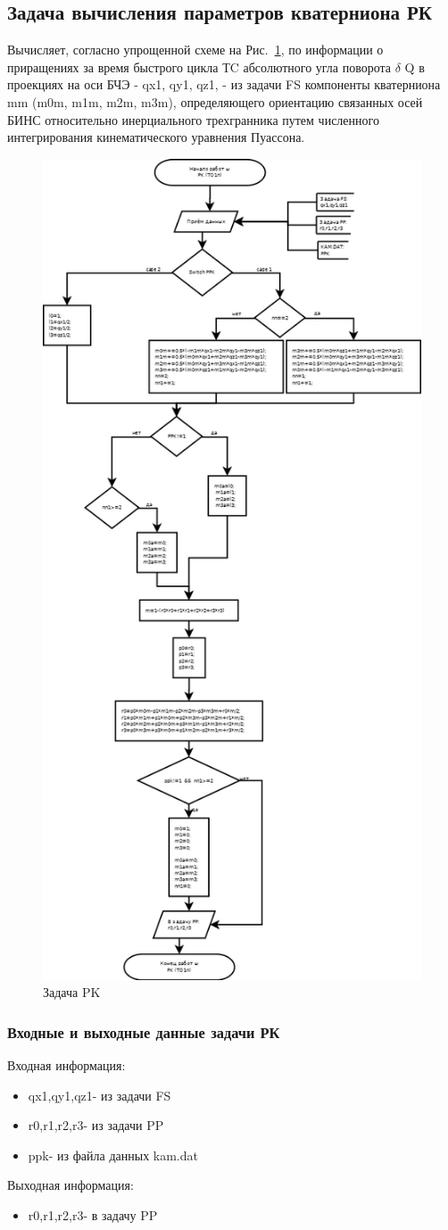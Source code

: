 \subsection{Задача вычисления параметров кватерниона РК}
Вычисляет, согласно упрощенной схеме на Рис.~\ref{fig:PK},  по  информации о приращениях за время быстрого цикла ТC  абсолютного угла поворота $\delta$ Q в проекциях на оси БЧЭ -  qx1, qy1, qz1, - из задачи  FS 
компоненты кватерниона mm (m0m, m1m, m2m, m3m), определяющего  ориентацию связанных осей БИНС относительно инерциального трехгранника путем численного 
интегрирования кинематического уравнения Пуассона.
\begin{figure}[H]
    \centering
    \includegraphics[width=0.5\linewidth]{images/PK.png}
    \caption{Задача PK}
    \label{fig:PK}
\end{figure}
\subsubsection{Входные и выходные данные задачи РК}
Входная информация:
\begin{itemize}
\item qx1,qy1,qz1- из задачи  FS
\item r0,r1,r2,r3- из задачи  PP
\item ppk- из файла данных kam.dat
\end{itemize}
Выходная информация:
\begin{itemize}
    \item r0,r1,r2,r3- в задачу PP
\end{itemize}
